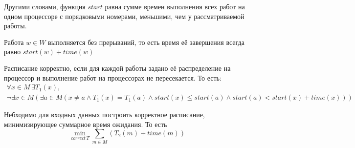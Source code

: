 \documentclass[a4paper,12pt]{article}
\begin{document}
Другими словами, функция $start$ равна сумме времен выполнения всех работ на одном процессоре
с порядковыми номерами, меньшими, чем у рассматриваемой работы.

Работа $w \in W$ выполняется без прерываний,
то есть время её завершения всегда равно $start(w) + time(w)$

Расписание корректно, если для каждой работы задано её распределение на процессор и
выполнение работ на процессорах не пересекается. То есть:
\begin{gather*}
    \forall x \in M \, \exists T_1(x),\\
    \neg \exists x \in M (\exists a \in M (x \neq a \wedge T_1(x) = T_1(a)
    \wedge start(x) \leq start(a) \wedge start(a) < start(x)+time(x)))
\end{gather*}

Небходимо для входных данных построить корректное расписание, минимизирующее суммарное время ожидания.
То есть
\[\min_{correct \, T} \sum_{m \in M} (T_2(m)+time(m))\]
\end{document}
